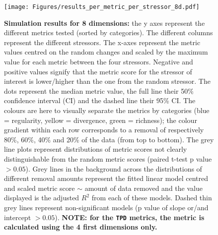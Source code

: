 \documentclass[12pt,letterpaper]{article}
\begin{document}
\begin{figure}[!htbp]
\centering
   \texttt{[image: Figures/results\_per\_metric\_per\_stressor\_8d.pdf]}
\caption{\scriptsize{\textbf{Simulation results for 8 dimensions:} the y axes represent the different metrics tested (sorted by categories).
The different columns represent the different stressors. The x-axes represent the metric values centred on the random changes and scaled by the maximum value for each metric between the four stressors.
Negative and positive values signify that the metric score for the stressor of interest is lower/higher than the one from the random stressor.
The dots represent the median metric value, the full line their 50\% confidence interval (CI) and the dashed line their 95\% CI.
The colours are here to visually separate the metrics by categories (blue = regularity, yellow = divergence, green = richness); the colour gradient within each row corresponds to a removal of respectively 80\%, 60\%, 40\% and 20\% of the data (from top to bottom).
The grey line plots represent distributions of metric scores not clearly distinguishable from the random metric scores (paired t-test p value $> 0.05$).
Grey lines in the background across the distributions of different removal amounts represent the fitted linear model centred and scaled metric score $\sim$ amount of data removed and the value displayed is the adjusted $R^2$ from each of these models.
Dashed thin grey lines represent non-significant models (p value of slope or/and intercept $> 0.05$).
\textbf{NOTE: for the \texttt{TPD} metrics, the metric is calculated using the 4 first dimensions only.}
}}
\label{Fig:simulation_results_8d}
\end{figure}
\bigskip
\end{document}
